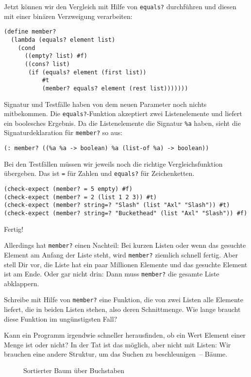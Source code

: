 Jetzt können wir den Vergleich mit Hilfe von \lstinline{equals?}
durchführen und diesen mit einer binären Verzweigung verarbeiten:
%
\begin{lstlisting}
(define member?
  (lambda (equals? element list)
    (cond
      ((empty? list) #f)
      ((cons? list)
       (if (equals? element (first list))
           #t
           (member? equals? element (rest list)))))))
\end{lstlisting}
%
Signatur und Testfälle haben von dem neuen Parameter noch nichts
mitbekommen.  Die \lstinline{equals?}-Funktion akzeptiert zwei
Listenelemente und liefert ein boolesches Ergebnis.  Da die
Listenelemente die Signatur \lstinline{%a}
haben, sieht die Signaturdeklaration für \lstinline{member?} so aus:
%
\begin{lstlisting}
(: member? ((%a %a -> boolean) %a (list-of %a) -> boolean))
\end{lstlisting}
%
Bei den Testfällen müssen wir jeweils noch die richtige
Vergleichsfunktion übergeben.  Das ist \lstinline{=} für Zahlen und
\lstinline{equals?} für Zeichenketten.
%
\begin{lstlisting}
(check-expect (member? = 5 empty) #f)
(check-expect (member? = 2 (list 1 2 3)) #t)
(check-expect (member? string=? "Slash" (list "Axl" "Slash")) #t)
(check-expect (member? string=? "Buckethead" (list "Axl" "Slash")) #f)
\end{lstlisting}
%
Fertig!

Allerdings hat \lstinline{member?} einen Nachteil: Bei kurzen Listen
oder wenn das gesuchte Element am Anfang der Liste steht, wird
\lstinline{member?} ziemlich schnell fertig.  Aber stell Dir vor, die
Liste hat ein paar Millionen Elemente und das gesuchte Element ist am
Ende.  Oder gar nicht drin: Dann muss \lstinline{member?} die gesamte
Liste abklappern.
%
\begin{aufgabeinline}
  Schreibe mit Hilfe von \lstinline{member?} eine Funktion, die von
  zwei Listen alle Elemente liefert, die in beiden Listen stehen, also
  deren Schnittmenge.  Wie lange braucht diese Funktion im
  ungünstigsten Fall?
\end{aufgabeinline}
%
Kann ein Programm irgendwie schneller herausfinden, ob ein Wert Element einer Menge
ist oder nicht?  In der Tat ist das möglich, aber nicht mit Listen:
Wir brauchen eine andere Struktur, um das Suchen zu beschleunigen~--
Bäume.

\begin{figure}[tb]
  \caption{Sortierter Baum über Buchstaben}
  \label{fig:searchtree}
\end{figure}


